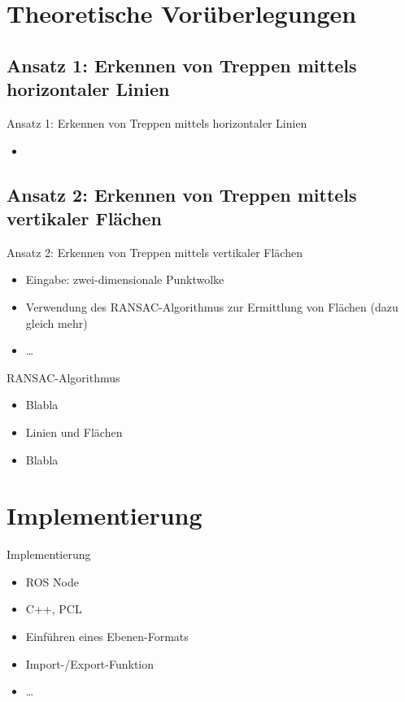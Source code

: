 \documentclass[18pt]{beamer}
\begin{document}
\section{Theoretische Vorüberlegungen}

\subsection{Ansatz 1: Erkennen von Treppen mittels horizontaler Linien}
\begin{frame}{Ansatz 1: Erkennen von Treppen mittels horizontaler Linien}
	\begin{itemize}
		\item
	\end{itemize}
\end{frame}


\subsection{Ansatz 2: Erkennen von Treppen mittels vertikaler Flächen}
\begin{frame}{Ansatz 2: Erkennen von Treppen mittels vertikaler Flächen}
	\begin{itemize}
		\item Eingabe: zwei-dimensionale Punktwolke
		\item Verwendung des RANSAC-Algorithmus zur Ermittlung von Flächen (dazu gleich mehr)
		\item \dots
	\end{itemize}
\end{frame}

\begin{frame}{RANSAC-Algorithmus}
	\begin{itemize}
		\item Blabla
		\item Linien und Flächen
		\item Blabla
	\end{itemize}
\end{frame}



\section{Implementierung}

\begin{frame}{Implementierung}
	\begin{itemize}
		\item ROS Node
		\item C++, PCL
		\item Einführen eines Ebenen-Formats
		\item Import-/Export-Funktion
		\item \dots
	\end{itemize}
\end{frame}
\end{document}
